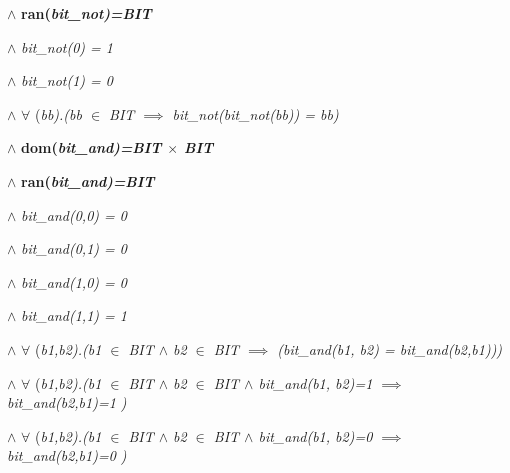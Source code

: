 \hspace*{0.20in} $\land$  \bf ran\rm (\it bit\_not\rm )\rm =\it BIT 

\hspace*{0.20in} $\land$  \it bit\_not\rm (\rm 0\rm ) \rm = \rm 1

\hspace*{0.20in} $\land$  \it bit\_not\rm (\rm 1\rm ) \rm = \rm 0

\hspace*{0.20in} $\land$   $\forall$ \rm (\it bb\rm )\rm .\rm (\it bb  $\in$  \it BIT  $\implies$  \it bit\_not\rm (\it bit\_not\rm (\it bb\rm )\rm ) \rm = \it bb\rm )

\vspace*{4mm}
\hspace*{0.20in} $\land$  \bf dom\rm (\it bit\_and\rm )\rm =\it BIT $\times$ \it BIT

\hspace*{0.20in} $\land$  \bf ran\rm (\it bit\_and\rm )\rm =\it BIT 

\hspace*{0.20in} $\land$  \it bit\_and\rm (\rm 0\rm ,\rm 0\rm ) \rm = \rm 0

\hspace*{0.20in} $\land$  \it bit\_and\rm (\rm 0\rm ,\rm 1\rm ) \rm = \rm 0

\hspace*{0.20in} $\land$  \it bit\_and\rm (\rm 1\rm ,\rm 0\rm ) \rm = \rm 0

\hspace*{0.20in} $\land$  \it bit\_and\rm (\rm 1\rm ,\rm 1\rm ) \rm = \rm 1

\hspace*{0.20in}

\hspace*{0.20in} $\land$   $\forall$ \rm (\it b1\rm ,\it b2\rm )\rm .\rm (\it b1  $\in$  \it BIT  $\land$  \it b2  $\in$  \it BIT  $\implies$  \rm (\it bit\_and\rm (\it b1\rm , \it b2\rm ) \rm = \it bit\_and\rm (\it b2\rm ,\it b1\rm )\rm )\hspace*{0.10in}\rm )

\hspace*{0.20in} $\land$   $\forall$ \rm (\it b1\rm ,\it b2\rm )\rm .\rm (\it b1  $\in$  \it BIT  $\land$  \it b2  $\in$  \it BIT  $\land$  \it bit\_and\rm (\it b1\rm , \it b2\rm )\rm =\rm 1  $\implies$  \it bit\_and\rm (\it b2\rm ,\it b1\rm )\rm =\rm 1 \rm )

\hspace*{0.20in} $\land$   $\forall$ \rm (\it b1\rm ,\it b2\rm )\rm .\rm (\it b1  $\in$  \it BIT  $\land$  \it b2  $\in$  \it BIT  $\land$  \it bit\_and\rm (\it b1\rm , \it b2\rm )\rm =\rm 0  $\implies$  \it bit\_and\rm (\it b2\rm ,\it b1\rm )\rm =\rm 0 \rm )

